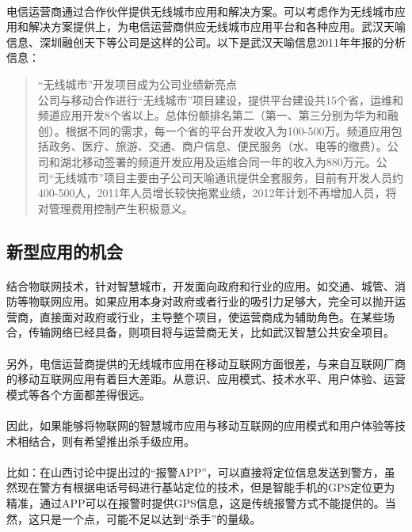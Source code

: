 \documentclass[a4paper,14pt,openany]{article}
\begin{document}
\paragraph{}
电信运营商通过合作伙伴提供无线城市应用和解决方案。可以考虑作为无线城市应用和解决方案提供上，为电信运营商供应无线城市应用平台和各种应用。武汉天喻信息、深圳融创天下等公司是这样的公司。以下是武汉天喻信息2011年年报的分析信息：
\begin{quote}
“无线城市”开发项目成为公司业绩新亮点
\\
公司与移动合作进行“无线城市”项目建设，提供平台建设共15个省，运维和频道应用开发8个省以上。总体份额排名第二（第一、第三分别为华为和融创）。根据不同的需求，每一个省的平台开发收入为100-500万。频道应用包括政务、医疗、旅游、交通、商户信息、便民服务（水、电等的缴费）。公司和湖北移动签署的频道开发应用及运维合同一年的收入为880万元。公司“无线城市”项目主要由子公司天喻通讯提供全套服务，目前有开发人员约400-500人，2011年人员增长较快拖累业绩，2012年计划不再增加人员，将对管理费用控制产生积极意义。
\end{quote}

\subsection{新型应用的机会}
\paragraph{}
结合物联网技术，针对智慧城市，开发面向政府和行业的应用。如交通、城管、消防等物联网应用。如果应用本身对政府或者行业的吸引力足够大，完全可以抛开运营商，直接面对政府或行业，主导整个项目，使运营商成为辅助角色。在某些场合，传输网络已经具备，则项目将与运营商无关，比如武汉智慧公共安全项目。
\paragraph{}另外，电信运营商提供的无线城市应用在移动互联网方面很差，与来自互联网厂商的移动互联网应用有着巨大差距。从意识、应用模式、技术水平、用户体验、运营模式等各个方面都差得很远。
\paragraph{}因此，如果能够将物联网的智慧城市应用与移动互联网的应用模式和用户体验等技术相结合，则有希望推出杀手级应用。
\paragraph{}比如：在山西讨论中提出过的“报警APP”，可以直接将定位信息发送到警方，虽然现在警方有根据电话号码进行基站定位的技术，但是智能手机的GPS定位更为精准，通过APP可以在报警时提供GPS信息，这是传统报警方式不能提供的。当然，这只是一个点，可能不足以达到“杀手”的量级。
\end{document}
